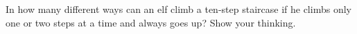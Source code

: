 In how many different ways can an elf climb a ten-step staircase if he climbs only one or two steps at a time and always goes up? Show your thinking.
